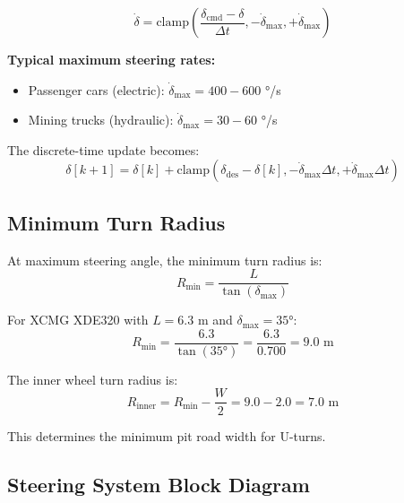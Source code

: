 \documentclass[11pt,a4paper]{article}
\begin{document}
\begin{equation}
\boxed{\dot{\delta} = \text{clamp}\left(\frac{\delta_{\text{cmd}} - \delta}{\Delta t}, -\dot{\delta}_{\max}, +\dot{\delta}_{\max}\right)}
\label{eq:rate_limit}
\end{equation}

\textbf{Typical maximum steering rates:}
\begin{itemize}
    \item Passenger cars (electric): $\dot{\delta}_{\max} = 400 - 600$ °/s
    \item Mining trucks (hydraulic): $\dot{\delta}_{\max} = 30 - 60$ °/s
\end{itemize}

The discrete-time update becomes:
\begin{equation}
\delta[k+1] = \delta[k] + \text{clamp}\left(\delta_{\text{des}} - \delta[k], -\dot{\delta}_{\max} \Delta t, +\dot{\delta}_{\max} \Delta t\right)
\end{equation}

\subsection{Minimum Turn Radius}

At maximum steering angle, the minimum turn radius is:
\begin{equation}
R_{\min} = \frac{L}{\tan(\delta_{\max})}
\end{equation}

For XCMG XDE320 with $L = 6.3$ m and $\delta_{\max} = 35°$:
\begin{equation}
R_{\min} = \frac{6.3}{\tan(35°)} = \frac{6.3}{0.700} = 9.0 \text{ m}
\end{equation}

The inner wheel turn radius is:
\begin{equation}
R_{\text{inner}} = R_{\min} - \frac{W}{2} = 9.0 - 2.0 = 7.0 \text{ m}
\end{equation}

This determines the minimum pit road width for U-turns.

\subsection{Steering System Block Diagram}
\end{document}
